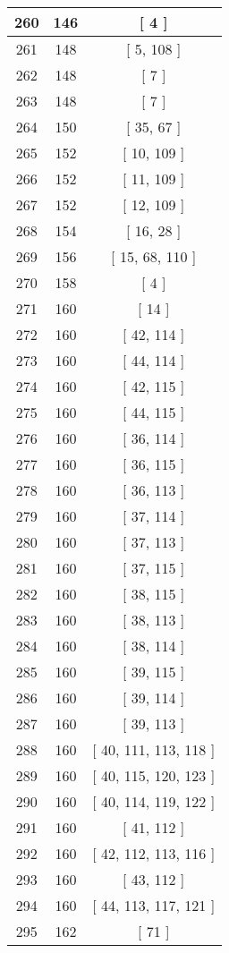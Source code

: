 \begin{center}
\begin{longtable}[H]{|| c c c ||}
260 & 146 & [ 4 ]
\\\hline
261 & 148 & [ 5, 108 ]
\\\hline
262 & 148 & [ 7 ]
\\\hline
263 & 148 & [ 7 ]
\\\hline
264 & 150 & [ 35, 67 ]
\\\hline
265 & 152 & [ 10, 109 ]
\\\hline
266 & 152 & [ 11, 109 ]
\\\hline
267 & 152 & [ 12, 109 ]
\\\hline
268 & 154 & [ 16, 28 ]
\\\hline
269 & 156 & [ 15, 68, 110 ]
\\\hline
270 & 158 & [ 4 ]
\\\hline
271 & 160 & [ 14 ]
\\\hline
272 & 160 & [ 42, 114 ]
\\\hline
273 & 160 & [ 44, 114 ]
\\\hline
274 & 160 & [ 42, 115 ]
\\\hline
275 & 160 & [ 44, 115 ]
\\\hline
276 & 160 & [ 36, 114 ]
\\\hline
277 & 160 & [ 36, 115 ]
\\\hline
278 & 160 & [ 36, 113 ]
\\\hline
279 & 160 & [ 37, 114 ]
\\\hline
280 & 160 & [ 37, 113 ]
\\\hline
281 & 160 & [ 37, 115 ]
\\\hline
282 & 160 & [ 38, 115 ]
\\\hline
283 & 160 & [ 38, 113 ]
\\\hline
284 & 160 & [ 38, 114 ]
\\\hline
285 & 160 & [ 39, 115 ]
\\\hline
286 & 160 & [ 39, 114 ]
\\\hline
287 & 160 & [ 39, 113 ]
\\\hline
288 & 160 & [ 40, 111, 113, 118 ]
\\\hline
289 & 160 & [ 40, 115, 120, 123 ]
\\\hline
290 & 160 & [ 40, 114, 119, 122 ]
\\\hline
291 & 160 & [ 41, 112 ]
\\\hline
292 & 160 & [ 42, 112, 113, 116 ]
\\\hline
293 & 160 & [ 43, 112 ]
\\\hline
294 & 160 & [ 44, 113, 117, 121 ]
\\\hline
295 & 162 & [ 71 ]
\\\hline

\end{longtable}
\end{center}
